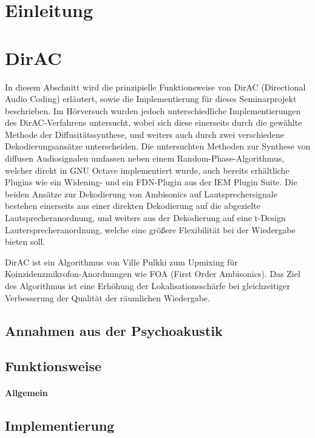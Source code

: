 \documentclass[12pt, a4paper]{article}
\begin{document}
\tableofcontents
\newpage

\section{Einleitung}

\section{DirAC}
In diesem Abschnitt wird die prinzipielle Funktionsweise von DirAC (Directional Audio Coding) erläutert, sowie die Implementierung für dieses Seminarprojekt beschrieben. Im Hörversuch wurden jedoch unterschiedliche Implementierungen des DirAC-Verfahrens untersucht, wobei sich diese einerseits durch die gewählte Methode der Diffusitätssynthese, und weiters auch durch zwei verschiedene Dekodierungsansätze unterscheiden. Die untersuchten Methoden zur Synthese von diffusen Audiosignalen umfassen neben einem Random-Phase-Algorithmus, welcher direkt in GNU Octave implementiert wurde, auch bereits erhältliche Plugins wie ein Widening- und ein FDN-Plugin aus der IEM Plugin Suite. Die beiden Ansätze zur Dekodierung von Ambisonics auf Lautsprechersignale bestehen einerseits aus einer direkten Dekodierung auf die abgezielte Lautsprecheranordnung, und weiters aus der Dekodierung auf eine t-Design Lautersprecheranordnung, welche eine größere Flexibilität bei der Wiedergabe bieten soll.

DirAC ist ein Algorithmus von Ville Pulkki \cite{pulkki} zum Upmixing für Koinzidenzmikrofon-Anordnungen wie FOA (First Order Ambisonics). Das Ziel des Algorithmus ist eine Erhöhung der Lokalisationsschärfe bei gleichzeitiger Verbesserung der Qualität der räumlichen Wiedergabe.

\newpage

    \subsection{Annahmen aus der Psychoakustik} \label{annahmen}
    
    \subsection{Funktionsweise}
    
        \paragraph{Allgemein}
        
    \subsection{Implementierung}
    
\end{document}
